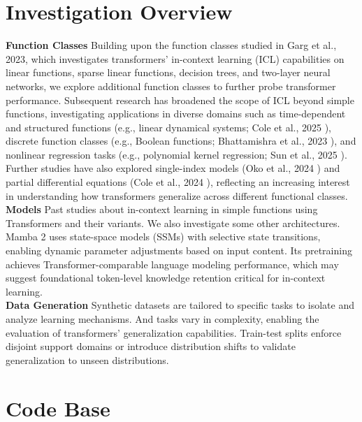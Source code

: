 \section*{Investigation Overview}
\textbf{Function Classes} Building upon the function classes studied in Garg et al., 2023\cite{garg2023transformerslearnincontextcase}, which investigates transformers' in-context learning (ICL) capabilities on linear functions, sparse linear functions, decision trees, and two-layer neural networks, we explore additional function classes to further probe transformer performance. Subsequent research has broadened the scope of ICL beyond simple functions, investigating applications in diverse domains such as time-dependent and structured functions (e.g., linear dynamical systems; Cole et al., 2025 \cite{cole2025incontextlearninglineardynamical}), discrete function classes (e.g., Boolean functions; Bhattamishra et al., 2023 \cite{bhattamishra2023understandingincontextlearningtransformers}), and nonlinear regression tasks (e.g., polynomial kernel regression; Sun et al., 2025 \cite{sun2025incontextlearningpolynomialkernel}). Further studies have also explored single-index models (Oko et al., 2024 \cite{oko2024pretrainedtransformerefficientlylearns}) and partial differential equations (Cole et al., 2024 \cite{cole2024provable}), reflecting an increasing interest in understanding how transformers generalize across different functional classes.\\\textbf{Models}    Past studies about in-context learning in simple functions using Transformers and their variants. 
We also investigate some other architectures.
Mamba 2\cite{dao2024transformersssmsgeneralizedmodels} uses state-space models (SSMs) with selective state transitions, enabling dynamic parameter adjustments based on input content.  
Its pretraining achieves Transformer-comparable language modeling performance, which may suggest foundational token-level knowledge retention critical for in-context learning. 
\\\textbf{Data Generation}
Synthetic datasets are tailored to specific tasks to isolate and analyze learning mechanisms. And tasks vary in complexity\cite{oko2024pretrainedtransformerefficientlylearns}, enabling the evaluation of transformers’ generalization capabilities. 
Train-test splits enforce disjoint support domains or introduce distribution shifts\cite{garg2023transformerslearnincontextcase} to validate generalization to unseen distributions.

\section*{Code Base}

